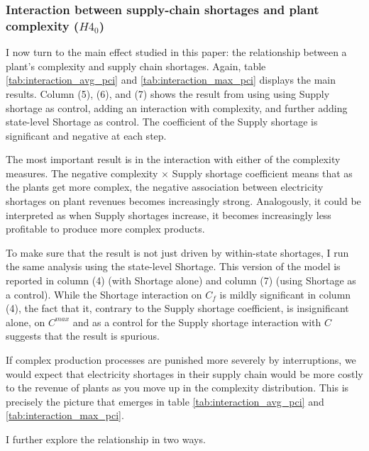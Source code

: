 \documentclass[11pt]{article}
\begin{document}
\subsubsection{Interaction between supply-chain shortages and plant complexity ($H4_0$)}
\label{sub:h4}
I now turn to the main effect studied in this paper: the relationship between a plant's complexity and supply chain shortages. Again, table \ref{tab:interaction_avg_pci} and \ref{tab:interaction_max_pci} displays the main results. Column (5), (6), and (7) shows the result from using using Supply shortage as control, adding an interaction with complexity, and further adding state-level Shortage as control. The coefficient of the Supply shortage is significant and negative at each step. 

The most important result is in the interaction with either of the complexity measures. The negative complexity $\times$ Supply shortage coefficient means that as the plants get more complex, the negative association between electricity shortages on plant revenues becomes increasingly strong. Analogously, it could be interpreted as when Supply shortages increase, it becomes increasingly less profitable to produce more complex products.

To make sure that the result is not just driven by within-state shortages, I run the same analysis using the state-level Shortage. This version of the model is reported in column (4) (with Shortage alone) and column (7) (using Shortage as a control). While the Shortage interaction on $C_f$ is mildly significant in column (4), the fact that it, contrary to the Supply shortage coefficient, is insignificant alone, on $C^{max}$ and as a control for the Supply shortage interaction with $C$ suggests that the result is spurious. 

If complex production processes are punished more severely by interruptions, we would expect that electricity shortages in their supply chain would be more costly to the revenue of plants as you move up in the complexity distribution. This is precisely the picture that emerges in table \ref{tab:interaction_avg_pci} and \ref{tab:interaction_max_pci}.  

I further explore the relationship in two ways.
\end{document}
